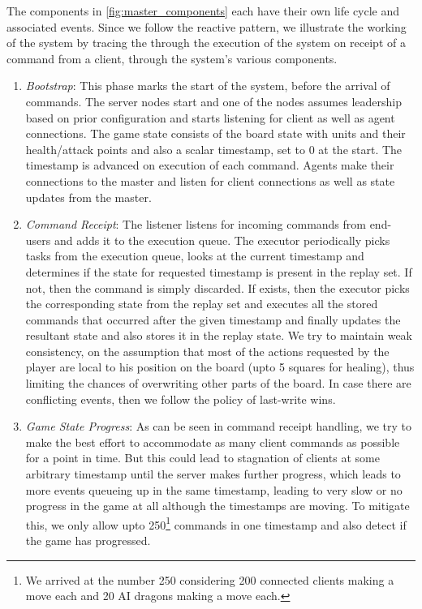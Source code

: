 \documentclass[a4paper]{IEEEtran}
\begin{document}
  The components in \autoref{fig:master_components} each have their own life cycle and associated events. Since we follow the reactive pattern, we illustrate the working of the system by tracing the through the execution of the system on receipt of a command from a client, through the system's various components.
  
  \begin{enumerate}
    \item \emph{Bootstrap}: This phase marks the start of the system, before the arrival of commands. The server nodes start and one of the nodes assumes leadership based on prior configuration and starts listening for client as well as agent connections. The game state consists of the board state with units and their health/attack points and also a scalar timestamp, set to 0 at the start. The timestamp is advanced on execution of each command. Agents make their connections to the master and listen for client connections as well as state updates from the master. 
  
    \item \emph{Command Receipt}: The listener listens for incoming commands from end-users and adds it to the execution queue. The executor periodically picks tasks from the execution queue, looks at the current timestamp and determines if the state for requested timestamp is present in the replay set. If not, then the command is simply discarded. If exists, then the executor picks the corresponding state from the replay set and executes all the stored commands that occurred after the given timestamp and finally updates the resultant state and also stores it in the replay state. We try to maintain weak consistency, on the assumption that most of the actions requested by the player are local to his position on the board (upto 5 squares for healing), thus limiting the chances of overwriting other parts of the board. In case there are conflicting events, then we follow the policy of last-write wins. 

    \item \emph{Game State Progress}: As can be seen in command receipt handling, we try to make the best effort to accommodate as many client commands as possible for a point in time. But this could lead to stagnation of clients at some arbitrary timestamp until the server makes further progress, which leads to more events queueing up in the same timestamp, leading to very slow or no progress in the game at all although the timestamps are moving. To mitigate this, we only allow upto 250\footnote{We arrived at the number 250 considering 200 connected clients making a move each and 20 AI dragons making a move each.} commands in one timestamp and also detect if the game has progressed.


\end{enumerate}
\end{document}
